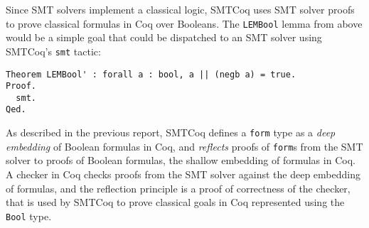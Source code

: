 \documentclass{article}
\begin{document}
	Since SMT solvers implement 
	a classical logic, SMTCoq 
	uses SMT solver proofs to 
	prove classical formulas in 
	Coq over Booleans. The 
	\texttt{LEMBool} lemma from 
	above would be a simple goal that 
	could be dispatched to an SMT 
	solver using SMTCoq's \texttt{smt}
	tactic:
	\begin{verbatim}
Theorem LEMBool' : forall a : bool, a || (negb a) = true.
Proof.
  smt.
Qed.
	\end{verbatim}
	As described in the previous report, 
	SMTCoq defines a \texttt{form} type
	as a \textit{deep embedding} of Boolean 
	formulas in Coq, and \textit{reflects} 
	proofs of \texttt{form}s from the SMT 
	solver to proofs of Boolean formulas, 
	the shallow embedding of formulas 
	in Coq. A checker in Coq checks 
	proofs from the SMT solver against
	the deep embedding of formulas, and 
	the reflection principle is a proof
	of correctness of the checker, that 
	is used by SMTCoq to prove classical
	goals in Coq represented using the
	\texttt{Bool} type.
	
	
\end{document}
